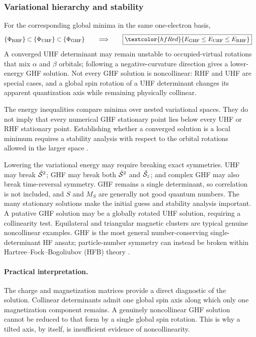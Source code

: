 \documentclass[11pt,a4paper,titlepage]{article}
\numberwithin{equation}{section}
\newcommand{\chS}{\Hat{\mathcal{S}}}
\newcommand{\red}[1]{\textcolor{hfRed}{#1}}
\begin{document}
\subsubsection{Variational hierarchy and stability}

For the corresponding global minima in the same one-electron basis,
\begin{equation}
    \{\Phi_\text{RHF}\}\subset\{\Phi_\text{UHF}\}
    \subset\{\Phi_\text{GHF}\}
  \qquad\Longrightarrow\qquad
  \boxed{\red{E_\text{GHF}\leq E_\text{UHF}\leq E_\text{RHF}}}
\end{equation}
A converged UHF determinant may remain unstable to occupied-virtual rotations
that mix $\alpha$ and $\beta$ orbitals; following a negative-curvature
direction gives a lower-energy GHF solution. Not every GHF solution is
noncollinear: RHF and UHF are special cases, and a global spin rotation of a
UHF determinant changes its apparent quantization axis while remaining
physically collinear.

The energy inequalities compare minima over nested variational spaces. They do
not imply that every numerical GHF stationary point lies below every UHF or
RHF stationary point. Establishing whether a converged solution is a local
minimum requires a stability analysis with respect to the orbital rotations
allowed in the larger space \citep{Thouless1960,SeegerPople1977}.

Lowering the variational energy may require breaking exact symmetries. UHF
may break $\chS^2$; GHF may break both $\chS^2$ and $\chS_z$; and complex GHF
may also break time-reversal symmetry. GHF remains a single determinant, so
correlation is not included, and $S$ and $M_S$ are generally not good quantum
numbers. The many stationary solutions make the initial guess and
stability analysis important. A putative GHF solution may be a globally
rotated UHF solution, requiring a collinearity test. Equilateral
\red{} and triangular magnetic clusters are typical genuine
noncollinear examples. GHF is the most general number-conserving
single-determinant HF ansatz; particle-number symmetry can instead be broken
within Hartree--Fock--Bogoliubov (HFB) theory \citep{RingSchuck1980,Scuseria2011}.

\paragraph{Practical interpretation.}

The charge and magnetization matrices provide a direct diagnostic of the
solution. Collinear determinants admit one global spin axis along which only
one magnetization component remains. A genuinely noncollinear GHF solution
cannot be reduced to that form by a single global spin rotation. This is why a
tilted axis, by itself, is insufficient evidence of noncollinearity.
\end{document}
